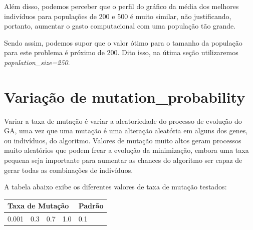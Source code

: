 \documentclass[12pt]{article}
\begin{document}
Além disso, podemos perceber que o perfil do gráfico da média dos melhores indivíduos para populações de 200 e 500 é muito similar, não justificando, portanto, aumentar o gasto computacional com uma população tão grande.

Sendo assim, podemos supor que o valor ótimo para o tamanho da população para este problema é próximo de 200. Dito isso, na útima seção utilizaremos \textit{population\_size=250}.

\section{Variação de mutation\_probability}

Variar a taxa de mutação é variar a aleatoriedade do processo de evolução do GA, uma vez que uma mutação é uma alteração aleatória em alguns dos genes, ou indivíduos, do algoritmo. Valores de mutação muito altos geram processos muito aleatórios que podem frear a evolução da minimização, embora uma taxa pequena seja importante para aumentar as chances do algoritmo ser capaz de gerar todas as combinações de indivíduos.

A tabela abaixo exibe os diferentes valores de taxa de mutação testados:

\begin{table}[H]
	\centering
	\begin{tabular}{|l|l|l|l|l|}
		\hline
		\multicolumn{4}{|l|}{Taxa de Mutação} & Padrão \\ \hline
		0.001    & 0.3    & 0.7    & 1.0    & 0.1    \\ \hline
	\end{tabular}
\end{table}
\end{document}
